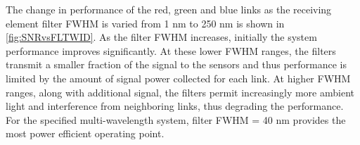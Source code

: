 The change in performance of the red, green and blue links as the receiving element filter FWHM is varied from 1 nm to 250 nm is shown in \figurename{ \ref{fig:SNRvsFLTWID}}. As the filter FWHM increases, initially the system performance improves significantly. At these lower FWHM ranges, the filters transmit a smaller fraction of the signal to the sensors and thus performance is limited by the amount of signal power collected for each link. At higher FWHM ranges, along with additional signal, the filters permit increasingly more ambient light and interference from neighboring links, thus degrading the performance. For the specified multi-wavelength system, filter FWHM = 40 nm provides the most power efficient operating point.









